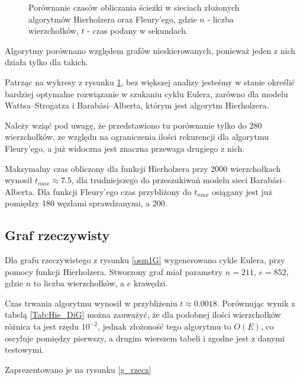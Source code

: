 \documentclass[a4paper, 12pt, twoside, openright]{article}
\begin{document}
\begin{figure}[!p]
	\caption[]{Porównanie czasów obliczania ścieżki w sieciach złożonych algorytmów Hierholzera oraz Fleury'ego, gdzie $n$ - liczba wierzchołków, $t$ - czas podany w sekundach.}
	\label{fh}
\end{figure}

\par\indent

	Algorytmy porównano względem grafów nieskierowanych, ponieważ jeden z nich działa tylko dla takich.
	
	Patrząc na wykresy z rysunku \ref{fh}, bez większej analizy jesteśmy w stanie określić bardziej optymalne rozwiązanie w szukaniu cyklu Eulera, zarówno dla modelu Wattsa–Strogatza i Barabási–Alberta, którym jest algorytm Hierholzera. 
	
	Należy wziąć pod uwagę, że przedstawiono tu porównanie tylko do 280 wierzchołków, ze względu na ograniczenia ilości rekurencji dla algorytmu Fleury'ego, a już widoczna jest znaczna przewaga drugiego z nich.
	
	
	
	Maksymalny czas obliczony dla funkcji Hierholzera przy 2000 wierzchołkach wynosił $t_{max} \approx 7.5$, dla trudniejszego do przeszukiwań modelu sieci Barabási–Alberta. Dla funkcji Fleury'ego czas przybliżony do $t_{max}$ osiągany jest już pomiędzy 180 węzłami sprawdzanymi, a 200.
	


\subsection{Graf rzeczywisty}
\par\indent

Dla grafu rzeczywistego z rysunku \ref{osm1G} wygenerowano cykle Eulera, przy pomocy funkcji Hierholzera. Stworzony graf miał parametry $n=211$, $e=852$, gdzie $n$ to liczba wierzchołków, a $e$ krawędzi. 

Czas trwania algorytmu wynosił w przybliżeniu $t\approx0.0018$. Porównując wynik z tabelą \ref{Tab:Hie_DiG} można zauważyć, że dla podobnej ilości wierzchołków różnica ta jest rzędu $10^{-2}$, jednak złożoność tego algorytmu to $O(E)$, co oscyluje pomiędzy pierwszy, a drugim wierszem tabeli i zgodne jest z danymi testowymi.

Zaprezentowano je na rysunku \ref{g_rzecz}
\end{document}
